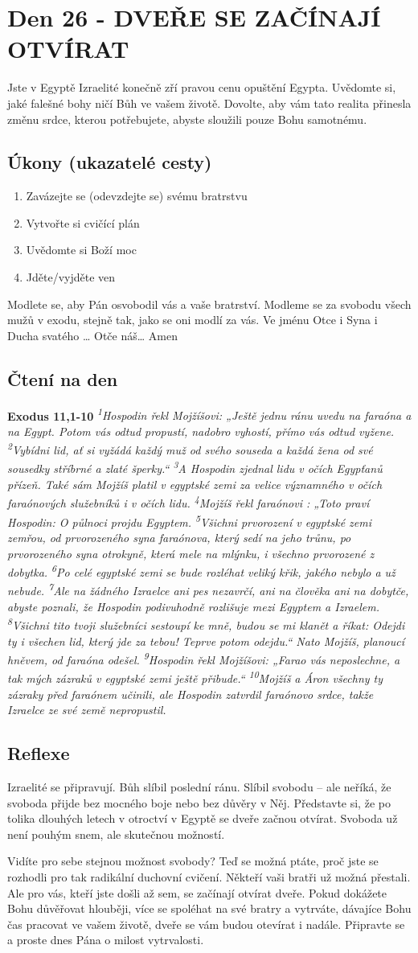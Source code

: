 \documentclass[11pt]{article}
\newcommand{\zacatekCtvrtyTyden}{
  Jste v Egyptě \newline
  Izraelité konečně zří pravou cenu opuštění Egypta. Uvědomte si, jaké falešné bohy ničí Bůh ve vašem životě.
Dovolte, aby vám tato realita přinesla změnu srdce, kterou potřebujete, abyste sloužili pouze Bohu samotnému.

\subsection*{Úkony (ukazatelé cesty)}
\begin{enumerate}
  \item Zavázejte se (odevzdejte se) svému bratrstvu
  \item Vytvořte si cvičící plán
  \item Uvědomte si Boží moc
  \item Jděte/vyjděte ven
\end{enumerate}
Modlete se, aby Pán osvobodil vás a vaše bratrství. \newline
Modleme se za svobodu všech mužů v exodu, stejně tak, jako se oni modlí za vás.\newline
Ve jménu Otce i Syna i Ducha svatého …  Otče náš… Amen
}
\begin{document}
\newpage
\section{Den 26 - DVEŘE SE ZAČÍNAJÍ OTVÍRAT}
\zacatekCtvrtyTyden
\subsection*{Čtení na den}
\textbf{Exodus 11,1-10}
\newline
\textit{
\textsuperscript{1}Hospodin řekl Mojžíšovi: „Ještě jednu ránu uvedu na faraóna a na Egypt. Potom vás odtud propustí, nadobro vyhostí, přímo vás odtud vyžene.
\textsuperscript{2}Vybídni lid, ať si vyžádá každý muž od svého souseda a každá žena od své sousedky stříbrné a zlaté šperky.“
\textsuperscript{3}A Hospodin zjednal lidu v očích Egypťanů přízeň. Také sám Mojžíš platil v egyptské zemi za velice významného v očích faraónových služebníků i v očích lidu.
\textsuperscript{4}Mojžíš řekl faraónovi : „Toto praví Hospodin: O půlnoci projdu Egyptem.
\textsuperscript{5}Všichni prvorození v egyptské zemi zemřou, od prvorozeného syna faraónova, který sedí na jeho trůnu, po prvorozeného syna otrokyně, která mele na mlýnku, i všechno prvorozené z dobytka.
\textsuperscript{6}Po celé egyptské zemi se bude rozléhat veliký křik, jakého nebylo a už nebude.
\textsuperscript{7}Ale na žádného Izraelce ani pes nezavrčí, ani na člověka ani na dobytče, abyste poznali, že Hospodin podivuhodně rozlišuje mezi Egyptem a Izraelem.
\textsuperscript{8}Všichni tito tvoji služebníci sestoupí ke mně, budou se mi klanět a říkat: Odejdi ty i všechen lid, který jde za tebou! Teprve potom odejdu.“ Nato Mojžíš, planoucí hněvem, od faraóna odešel.
\textsuperscript{9}Hospodin řekl Mojžíšovi: „Farao vás neposlechne, a tak mých zázraků v egyptské zemi ještě přibude.“
\textsuperscript{10}Mojžíš a Áron všechny ty zázraky před faraónem učinili, ale Hospodin zatvrdil faraónovo srdce, takže Izraelce ze své země nepropustil.  
}

\subsection*{Reflexe}
Izraelité se připravují. Bůh slíbil poslední ránu. Slíbil svobodu – ale neříká, že svoboda přijde bez
mocného boje nebo bez důvěry v Něj. Představte si, že po tolika dlouhých letech v otroctví v Egyptě se
dveře začnou otvírat. Svoboda už není pouhým snem, ale skutečnou možností.

Vidíte pro sebe stejnou možnost svobody? Teď se možná ptáte, proč jste se rozhodli pro tak radikální
duchovní cvičení. Někteří vaši bratři už možná přestali. Ale pro vás, kteří jste došli až sem, se začínají
otvírat dveře. Pokud dokážete Bohu důvěřovat hlouběji, více se spoléhat na své bratry a vytrváte, dávajíce
Bohu čas pracovat ve vašem životě, dveře se vám budou otevírat i nadále. Připravte se a proste dnes Pána
o milost vytrvalosti.
\end{document}
